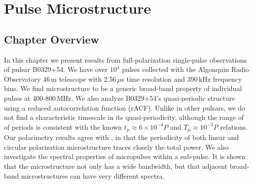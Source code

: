 \chapter{Pulse Microstructure}
\label{chapter:microstructure}



\section{Chapter Overview}
In this chapter we present results from full-polarization  
single-pulse observations of pulsar B0329+54. 
We have over $10^4$ pulses 
collected with the Algonquin Radio Observatory 46\,m telescope
with 2.56\,$\mu$s time resolution and 390\,kHz 
frequency bins. 
We find microstructure to be a generic broad-band property of 
individual pulses at 400-800\,MHz.
We also analyze B0329+54's quasi-periodic structure
using a reduced autocorrelation function (rACF). 
Unlike in other pulsars, 
we do not find a characteristic timescale in its quasi-periodicity, 
although the range of of periods is consistent with the known
$t_{\mu} \approx 6 \times 10^{-4} P$ and 
$T_{\mu} \approx 10^{-3} P$ relations. 
Our polarimetry results agree with 
\citet{2015ApJ...806..236M}, in that the periodicity 
of both linear and circular polarization microstructure 
traces closely the total power. 
We also investigate the spectral properties 
of micropulses within a sub-pulse. It is shown that the microstructure not 
only has a wide bandwidth, but that adjacent broad-band 
microstructures can have very different spectra. 


